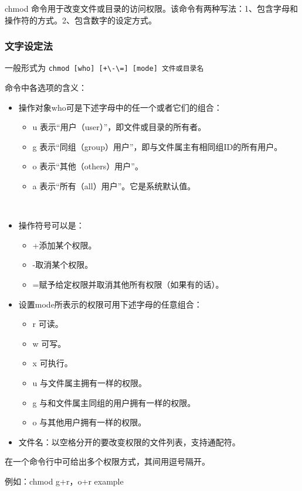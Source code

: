 chmod 命令用于改变文件或目录的访问权限。该命令有两种写法：1、包含字母和操作符的方式。2、包含数字的设定方式。

\subsubsection{文字设定法}
一般形式为
\verb*|chmod [who] [+\-\=] [mode] 文件或目录名|

命令中各选项的含义：
\begin{itemize}
\item 操作对象who可是下述字母中的任一个或者它们的组合：
\begin{itemize}
\item u 表示“用户（user）”，即文件或目录的所有者。　　
\item g 表示“同组（group）用户”，即与文件属主有相同组ID的所有用户。　　
\item o 表示“其他（others）用户”。　　
\item a 表示“所有（all）用户”。它是系统默认值。　
\end{itemize}　

\item 操作符号可以是：
\begin{itemize}
\item +添加某个权限。
\item -取消某个权限。　　
\item =赋予给定权限并取消其他所有权限（如果有的话）。　　
\end{itemize}

\item 设置mode所表示的权限可用下述字母的任意组合：　　
\begin{itemize}
\item r 可读。　　
\item w 可写。　　
\item x 可执行。　　
\item u 与文件属主拥有一样的权限。
\item g 与和文件属主同组的用户拥有一样的权限。
\item o 与其他用户拥有一样的权限。
\end{itemize}

\item 文件名：以空格分开的要改变权限的文件列表，支持通配符。

\end{itemize}

在一个命令行中可给出多个权限方式，其间用逗号隔开。

例如：chmod g+r，o+r example

